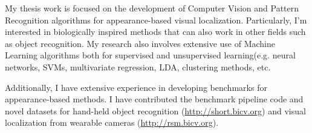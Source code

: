 My thesis work is focused on the development of Computer Vision and Pattern Recognition algorithms for appearance-based visual localization. Particularly, I'm interested in biologically inspired methods that can also work in other fields such as object recognition. My research also involves extensive use of Machine Learning algorithms both for supervised and unsupervised learning(e.g. neural networks, SVMs, multivariate regression, LDA, clustering methods, etc.

Additionally, I have extensive experience in developing benchmarks for appearance-based methods. I have contributed the benchmark pipeline code and novel datasets for hand-held object recognition (\url{http://short.bicv.org}) and visual localization from wearable cameras (\url{http://rsm.bicv.org}).

